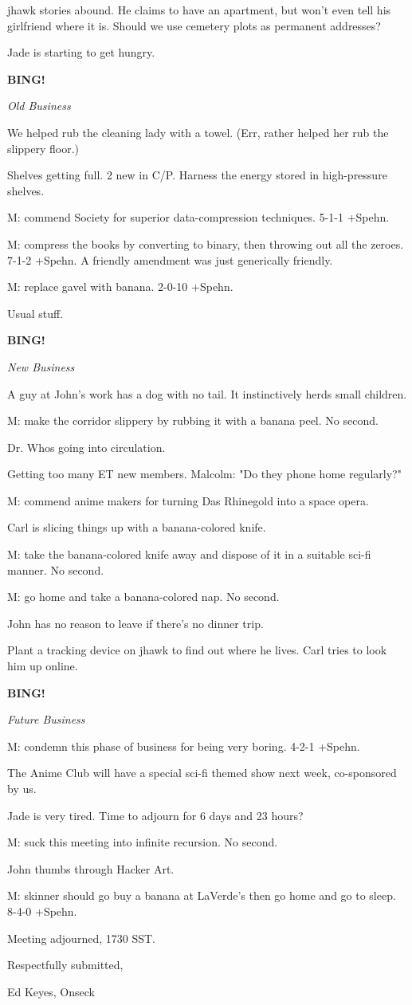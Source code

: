 \documentclass[12pt]{article}
\newcommand{\bing}{{\bf BING!} }
\newcommand{\goto}[1]{\bing \vskip 12pt \centerline{{\em{#1}}}}
\begin{document}
jhawk stories abound. He claims to have an apartment, but won't even tell his girlfriend where it is. Should we use cemetery plots as permanent addresses?

Jade is starting to get hungry.

\goto{Old Business}

We helped rub the cleaning lady with a towel. (Err, rather helped her rub the slippery floor.)

Shelves getting full. 2 new in C/P. Harness the energy stored in high-pressure shelves.

M: commend Society for superior data-compression techniques. 5-1-1 +Spehn.

M: compress the books by converting to binary, then throwing out all the zeroes. 7-1-2 +Spehn. A friendly amendment was just generically friendly.

M: replace gavel with banana. 2-0-10 +Spehn.

Usual stuff.

\goto{New Business}

A guy at John's work has a dog with no tail. It instinctively herds small children.

M: make the corridor slippery by rubbing it with a banana peel. No second.

Dr. Whos going into circulation.

Getting too many ET new members. Malcolm: "Do they phone home regularly?"

M: commend anime makers for turning Das Rhinegold into a space opera.

Carl is slicing things up with a banana-colored knife.

M: take the banana-colored knife away and dispose of it in a suitable sci-fi manner. No second.

M: go home and take a banana-colored nap. No second.

John has no reason to leave if there's no dinner trip.

Plant a tracking device on jhawk to find out where he lives. Carl tries to look him up online.

\goto{Future Business}

M: condemn this phase of business for being very boring. 4-2-1 +Spehn.

The Anime Club will have a special sci-fi themed show next week, co-sponsored by us.

Jade is very tired. Time to adjourn for 6 days and 23 hours?

M: suck this meeting into infinite recursion. No second.

John thumbs through Hacker Art.

M: skinner should go buy a banana at LaVerde's then go home and go to sleep. 8-4-0 +Spehn.

\vspace{12pt}

\noindent
Meeting adjourned, 1730 SST.

\vspace{18pt}

\centerline{Respectfully submitted,}
\centerline{Ed Keyes, Onseck}
\end{document}
